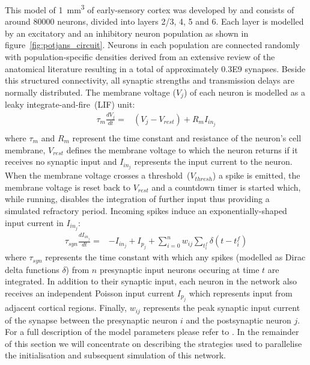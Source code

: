 \documentclass[utf8]{frontiersSCNS} %
\begin{document}
This model of \SI{1}{\milli\metre\cubed} of early-sensory cortex was developed by \citet{Potjans2012} and consists of around \num{80000} neurons, divided into layers 2/3, 4, 5 and 6.
Each layer is modelled by an excitatory and an inhibitory neuron population as shown in figure~\ref{fig:potjans_circuit}.
Neurons in each population are connected randomly with population-specific densities derived from an extensive review of the anatomical literature resulting in a total of approximately \num{0.3E9} synapses.
Beside this structured connectivity, all synaptic strengths and transmission delays are normally distributed.
The membrane voltage ($V_{j}$) of each neuron is modelled as a leaky integrate-and-fire~(LIF) unit:
%
\begin{align}
    \tau_{m} \frac{dV_{j}}{dt} = & (V_{j} - V_{rest}) + R_{m} I_{{in}_{j}} \label{eq:lif_neuron}\\
\end{align}
%
where $\tau_{m}$ and $R_{m}$ represent the time constant and resistance of the neuron's cell membrane, $V_{rest}$ defines the membrane voltage to which the neuron returns if it receives no synaptic input and $I_{{in}_{j}}$ represents the input current to the neuron.
When the membrane voltage crosses a threshold~($V_{thresh}$) a spike is emitted, the membrane voltage is reset back to $V_{rest}$ and a countdown timer is started which, while running, disables the integration of further input thus providing a simulated refractory period.
Incoming spikes induce an exponentially-shaped input current in $I_{{in}_{j}}$:
%
\begin{align}
    \tau_{syn} \frac{dI_{{in}_{j}}}{dt} = & -I_{{in}_{j}} + I_{p_{j}} + \sum_{i=0}^{n} w_{ij} \sum_{t_{i}^{f}}  \delta(t - t_{i}^{f})\label{eq:exp_neuron_input_current}
\end{align}
%
where $\tau_{syn}$ represents the time constant with which any spikes (modelled as Dirac delta functions $\delta$) from $n$ presynaptic input neurons occuring at time $t$ are integrated.
In addition to their synaptic input, each neuron in the network also receives an independent Poisson input current $I_{p_{j}}$ which represents input from adjacent cortical regions.
Finally, $w_{ij}$ represents the peak synaptic input current of the synapse between the presynaptic neuron $i$ and the postsynaptic neuron $j$.
For a full description of the model parameters please refer to \citet[tables 4 and 5]{Potjans2012}.
In the remainder of this section we will concentrate on describing the strategies used to parallelise the initialisation and subsequent simulation of this network.
\end{document}
